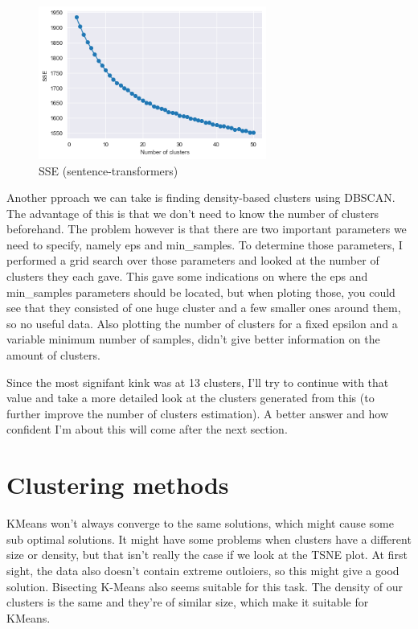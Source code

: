 \documentclass{article}
\begin{document}
\begin{figure}[h!]
\centering
\includegraphics[width=75mm]{sse-transformers.png}
\caption{SSE (sentence-transformers)}
\label{fig:ssetran}
\end{figure}

Another pproach we can take is finding density-based clusters using DBSCAN. The advantage of this is that we don't need to know the number of clusters beforehand. The problem however is that there are two important parameters we need to specify, namely eps and min\_samples. To determine those parameters, I performed a grid search over those parameters and looked at the number of clusters they each gave. This gave some indications on where the eps and min\_samples parameters should be located, but when ploting those, you could see that they consisted of one huge cluster and a few smaller ones around them, so no useful data. Also plotting the number of clusters for a fixed epsilon and a variable minimum number of samples, didn't give better information on the amount of clusters.

Since the most signifant kink was at 13 clusters, I'll try to continue with that value and take a more detailed look at the clusters generated from this (to further improve the number of clusters estimation). A better answer and how confident I'm about this will come after the next section.

\section{Clustering methods}

KMeans won't always converge to the same solutions, which might cause some sub optimal solutions. It might have some problems when clusters have a different size or density, but that isn't really the case if we look at the TSNE plot. At first sight, the data also doesn't contain extreme outloiers, so this might give a good solution. Bisecting K-Means also seems suitable for this task. The density of our clusters is the same and they're of similar size, which make it suitable for KMeans.
\end{document}
